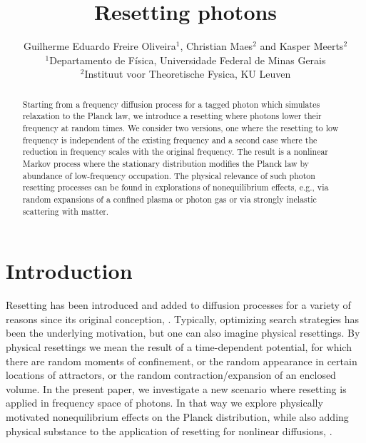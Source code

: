 \documentclass[a4paper,12pt,reqno,superscriptaddress,nofootinbib]{revtex4}
\theoremstyle{plain}
\theoremstyle{definition}
\theoremstyle{remark}
\newcommand{\0}{^{(0)}}
\newcommand{\1}{^{(1)}}
\newcommand{\2}{^{(2)}}
\begin{document}
	\title{Resetting photons}	
	\author{Guilherme Eduardo Freire Oliveira$^1$, Christian Maes$^2$ and Kasper Meerts$^{2}$\\ $^1$Departamento de Física, Universidade Federal de Minas Gerais \\ $^2$Instituut voor Theoretische Fysica, KU Leuven}

\begin{abstract}
Starting from a frequency diffusion process for a tagged photon which simulates relaxation to the Planck law, we introduce a resetting where photons lower their frequency at random times.
We consider two versions, one where the resetting to low frequency is independent of the existing frequency and a second case where the reduction in frequency scales with the original frequency.  The result is a nonlinear Markov process where the stationary distribution modifies the Planck law by abundance of low-frequency occupation. The physical relevance of such photon resetting processes can be found in explorations of nonequilibrium effects, e.g., via random expansions of a confined plasma or photon gas or via strongly inelastic scattering with matter.
\end{abstract}
\maketitle

\section{Introduction}
Resetting has been introduced and added to diffusion processes for a variety of reasons since its original conception, \cite{tong,evans1,evans2,evans3}.  Typically, optimizing search strategies has been the underlying motivation, but one can also imagine physical resettings.  By physical resettings we mean the result of a time-dependent potential, for which there are random moments of confinement, or the random appearance in certain locations of attractors, or the random contraction/expansion of an enclosed volume.  In the present paper, we investigate a new scenario where resetting is applied in frequency space of photons.  In that way we explore physically motivated nonequilibrium effects on the Planck distribution, while also adding physical substance to the application of resetting for nonlinear diffusions, \cite{przem}.\\
\end{document}
